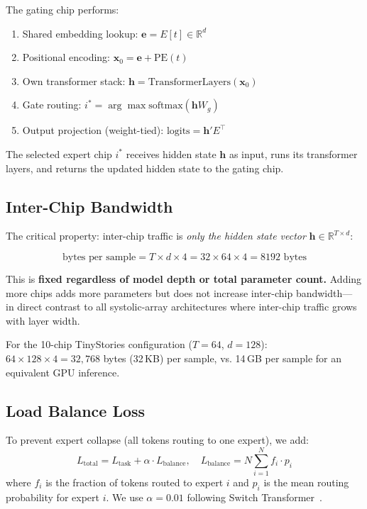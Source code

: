 \documentclass[11pt]{article}
\begin{document}
The gating chip performs:
\begin{enumerate}
\item Shared embedding lookup: $\mathbf{e} = E[t] \in \mathbb{R}^d$
\item Positional encoding: $\mathbf{x}_0 = \mathbf{e} + \text{PE}(t)$
\item Own transformer stack: $\mathbf{h} = \text{TransformerLayers}(\mathbf{x}_0)$
\item Gate routing: $i^* = \arg\max \text{softmax}(\mathbf{h} W_g)$
\item Output projection (weight-tied): $\text{logits} = \mathbf{h}' E^\top$
\end{enumerate}

The selected expert chip $i^*$ receives hidden state $\mathbf{h}$ as input, runs its
transformer layers, and returns the updated hidden state to the gating chip.

\subsection{Inter-Chip Bandwidth}

The critical property: inter-chip traffic is \emph{only the hidden state vector}
$\mathbf{h} \in \mathbb{R}^{T \times d}$:

\begin{equation}
\text{bytes per sample} = T \times d \times 4 = 32 \times 64 \times 4 = 8192 \text{ bytes}
\end{equation}

This is \textbf{fixed regardless of model depth or total parameter count.}
Adding more chips adds more parameters but does not increase inter-chip bandwidth---
in direct contrast to all systolic-array architectures where inter-chip traffic
grows with layer width.

For the 10-chip TinyStories configuration ($T=64$, $d=128$):
$64 \times 128 \times 4 = 32{,}768$ bytes (32\,KB) per sample, vs. 14\,GB per sample
for an equivalent GPU inference.

\subsection{Load Balance Loss}

To prevent expert collapse (all tokens routing to one expert), we add:
\begin{equation}
L_{\text{total}} = L_{\text{task}} + \alpha \cdot L_{\text{balance}},
\quad L_{\text{balance}} = N \sum_{i=1}^{N} f_i \cdot p_i
\end{equation}
where $f_i$ is the fraction of tokens routed to expert $i$ and $p_i$ is the
mean routing probability for expert $i$. We use $\alpha = 0.01$ following
Switch Transformer~\cite{fedus2022switch}.
\end{document}
